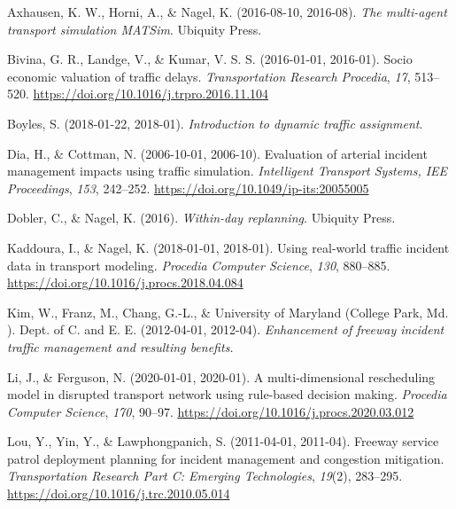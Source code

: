\documentclass[fancy, oneside, mastersfancy, ms]{byuthesis}
\newlength{\cslhangindent}
\newlength{\cslentryspacingunit} %
\newenvironment{CSLReferences}[2] %
 {%
  \setlength{\parindent}{0pt}
  \ifodd #1
  \let\oldpar\par
  \def\par{\hangindent=\cslhangindent\oldpar}
  \fi
  \setlength{\parskip}{#2\cslentryspacingunit}
 }%
 {}
\begin{document}
\hypertarget{refs}{}
\begin{CSLReferences}{1}{0}
\leavevmode{}%
Axhausen, K. W., Horni, A., \& Nagel, K. (2016-08-10, 2016-08).
\emph{The multi-agent transport simulation {MATSim}}. {Ubiquity Press}.

\leavevmode{}%
Bivina, G. R., Landge, V., \& Kumar, V. S. S. (2016-01-01, 2016-01).
Socio economic valuation of traffic delays. \emph{Transportation
Research Procedia}, \emph{17}, 513--520.
\url{https://doi.org/10.1016/j.trpro.2016.11.104}

\leavevmode{}%
Boyles, S. (2018-01-22, 2018-01). \emph{Introduction to dynamic traffic
assignment}.

\leavevmode{}%
Dia, H., \& Cottman, N. (2006-10-01, 2006-10). Evaluation of arterial
incident management impacts using traffic simulation. \emph{Intelligent
Transport Systems, IEE Proceedings}, \emph{153}, 242--252.
\url{https://doi.org/10.1049/ip-its:20055005}

\leavevmode{}%
Dobler, C., \& Nagel, K. (2016). \emph{Within-day replanning}. {Ubiquity
Press}.

\leavevmode{}%
Kaddoura, I., \& Nagel, K. (2018-01-01, 2018-01). Using real-world
traffic incident data in transport modeling. \emph{Procedia Computer
Science}, \emph{130}, 880--885.
\url{https://doi.org/10.1016/j.procs.2018.04.084}

\leavevmode{}%
Kim, W., Franz, M., Chang, G.-L., \& University of Maryland (College
Park, Md. ). Dept. of C. and E. E. (2012-04-01, 2012-04).
\emph{Enhancement of freeway incident traffic management and resulting
benefits.}

\leavevmode{}%
Li, J., \& Ferguson, N. (2020-01-01, 2020-01). A multi-dimensional
rescheduling model in disrupted transport network using rule-based
decision making. \emph{Procedia Computer Science}, \emph{170}, 90--97.
\url{https://doi.org/10.1016/j.procs.2020.03.012}

\leavevmode{}%
Lou, Y., Yin, Y., \& Lawphongpanich, S. (2011-04-01, 2011-04). Freeway
service patrol deployment planning for incident management and
congestion mitigation. \emph{Transportation Research Part C: Emerging
Technologies}, \emph{19}(2), 283--295.
\url{https://doi.org/10.1016/j.trc.2010.05.014}


\end{CSLReferences}
\end{document}
